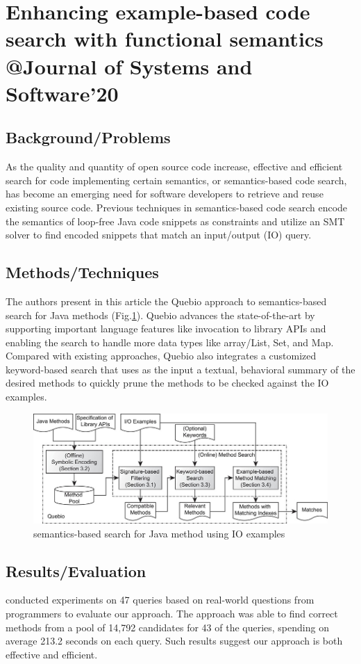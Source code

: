 \section{Enhancing example-based code search with functional semantics \\@Journal of Systems and Software'20}
\subsection{Background/Problems}
As the quality and quantity of open source code increase, effective and efficient search for code implementing certain semantics, or semantics-based code search, has become an emerging need for software developers to retrieve and reuse existing source code. Previous techniques in semantics-based code search encode the semantics of loop-free Java code snippets as constraints and utilize an SMT solver to find encoded snippets that match an input/output (IO) query.
\subsection{Methods/Techniques}
The authors present in this article the Quebio approach to semantics-based search for Java methods (Fig.\ref{fig:quebio}). Quebio advances the state-of-the-art by supporting important language features like invocation to library APIs and enabling the search to handle more data types like array/List, Set, and Map. Compared with existing approaches, Quebio also integrates a customized keyword-based search that uses as the input a textual, behavioral summary of the desired methods to quickly prune the methods to be checked against the IO examples.
\begin{figure}[h]
    \centering
    \includegraphics[width=.9\linewidth]{quebio.jpg} %
    \caption{semantics-based search for Java method using IO examples}	
    \label{fig:quebio}
\end{figure}
\subsection{Results/Evaluation}
conducted experiments on 47 queries based on real-world questions from programmers to evaluate our approach. The approach was able to find correct methods from a pool of 14,792 candidates for 43 of the queries, spending on average 213.2 seconds on each query. Such results suggest our approach is both effective and efficient.
